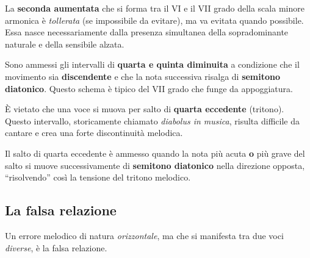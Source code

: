 \begin{osservazione}
	\label{oss:seconda_aumentata}
	La \textbf{seconda aumentata} che si forma tra il VI e il VII grado della scala minore armonica è \textit{tollerata} (se impossibile da evitare), ma va evitata quando possibile. Essa nasce necessariamente dalla presenza simultanea della sopradominante naturale e della sensibile alzata.
\end{osservazione}

\begin{osservazione}
	\label{oss:quarta_quinta_dim}
	Sono ammessi gli intervalli di \textbf{quarta e quinta diminuita} a condizione che il movimento sia \textbf{discendente} e che la nota successiva risalga di \textbf{semitono diatonico}. Questo schema è tipico del VII grado che funge da appoggiatura.
\end{osservazione}

\begin{errore}
	\label{err:quarta_eccedente}
	È vietato che una voce si muova per salto di \textbf{quarta eccedente} (tritono). Questo intervallo, storicamente chiamato \textit{diabolus in musica}, risulta difficile da cantare e crea una forte discontinuità melodica.
\end{errore}

\begin{regola}
	\label{reg:quarta_eccedente_eccezione}
	Il salto di quarta eccedente è ammesso quando la nota più acuta \textbf{o} più grave del salto si muove successivamente di \textbf{semitono diatonico} nella direzione opposta, ``risolvendo'' così la tensione del tritono melodico.
\end{regola}

\subsection{La falsa relazione}
\label{subsec:falsa_relazione}

Un errore melodico di natura \textit{orizzontale}, ma che si manifesta tra due voci \textit{diverse}, è la falsa relazione.

